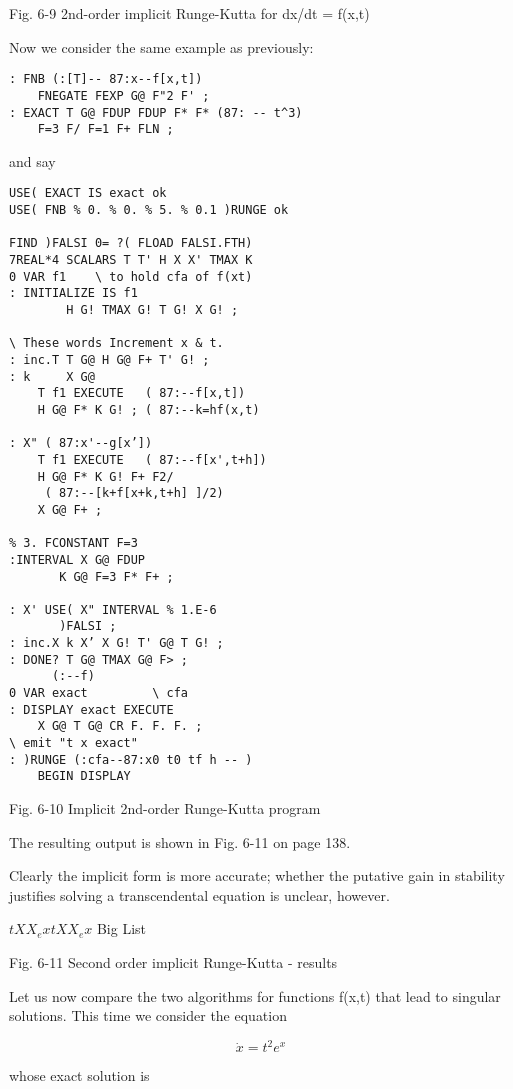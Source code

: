 Fig. 6-9 2nd-order implicit Runge-Kutta for dx/dt = f(x,t)

Now we consider the same example as previously:

\begin{lstlisting}
: FNB (:[T]-- 87:x--f[x,t])
    FNEGATE FEXP G@ F"2 F' ;
: EXACT T G@ FDUP FDUP F* F* (87: -- t^3)
    F=3 F/ F=1 F+ FLN ;
\end{lstlisting}

and say

\begin{lstlisting}
USE( EXACT IS exact ok
USE( FNB % 0. % 0. % 5. % 0.1 )RUNGE ok

FIND )FALSI 0= ?( FLOAD FALSI.FTH)
7REAL*4 SCALARS T T' H X X' TMAX K
0 VAR f1    \ to hold cfa of f(xt)
: INITIALIZE IS f1
        H G! TMAX G! T G! X G! ;

\ These words Increment x & t.
: inc.T T G@ H G@ F+ T' G! ;
: k     X G@
    T f1 EXECUTE   ( 87:--f[x,t])
    H G@ F* K G! ; ( 87:--k=hf(x,t)

: X" ( 87:x'--g[x’])
    T f1 EXECUTE   ( 87:--f[x',t+h])
    H G@ F* K G! F+ F2/
     ( 87:--[k+f[x+k,t+h] ]/2)
    X G@ F+ ;

% 3. FCONSTANT F=3
:INTERVAL X G@ FDUP
       K G@ F=3 F* F+ ;

: X' USE( X" INTERVAL % 1.E-6
       )FALSI ;
: inc.X k X’ X G! T' G@ T G! ;
: DONE? T G@ TMAX G@ F> ;
      (:--f)
0 VAR exact         \ cfa
: DISPLAY exact EXECUTE
    X G@ T G@ CR F. F. F. ;
\ emit "t x exact"
: )RUNGE (:cfa--87:x0 t0 tf h -- )
    BEGIN DISPLAY
\end{lstlisting}

Fig. 6-10 Implicit 2nd-order Runge-Kutta program

The resulting output is shown in Fig. 6-11 on page 138.

Clearly the implicit form is more accurate; whether the putative gain in stability justifies solving a transcendental equation is unclear, however.

$t X X_ex t X X_ex$
Big List

Fig. 6-11 Second order implicit Runge-Kutta - results

Let us now compare the two algorithms for functions f(x,t) that lead to singular solutions. This time we consider the equation

\begin{equation}
\dot{x} = t^2e^x
\end{equation}

whose exact solution is

